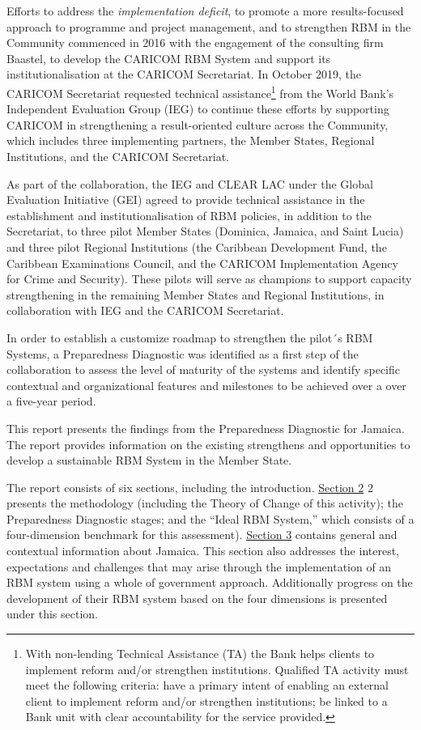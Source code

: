 \documentclass[
  10pt,
]{book}
\begin{document}
Efforts to address the \emph{implementation deficit}, to promote a more results-focused approach to programme and project management, and to strengthen RBM in the Community commenced in 2016 with the engagement of the consulting firm Baastel, to develop the CARICOM RBM System and support its institutionalisation at the CARICOM Secretariat. In October 2019, the CARICOM Secretariat requested technical assistance\footnote{With non-lending Technical Assistance (TA) the Bank helps clients to implement reform and/or strengthen institutions. Qualified TA activity must meet the following criteria: have a primary intent of enabling an external client to implement reform and/or strengthen institutions; be linked to a Bank unit with clear accountability for the service provided.} from the World Bank's Independent Evaluation Group (IEG) to continue these efforts by supporting CARICOM in strengthening a result-oriented culture across the Community, which includes three implementing partners, the Member States, Regional Institutions, and the CARICOM Secretariat.

As part of the collaboration, the IEG and CLEAR LAC under the Global Evaluation Initiative (GEI) agreed to provide technical assistance in the establishment and institutionalisation of RBM policies, in addition to the Secretariat, to three pilot Member States (Dominica, Jamaica, and Saint Lucia) and three pilot Regional Institutions (the Caribbean Development Fund, the Caribbean Examinations Council, and the CARICOM Implementation Agency for Crime and Security). These pilots will serve as champions to support capacity strengthening in the remaining Member States and Regional Institutions, in collaboration with IEG and the CARICOM Secretariat.

In order to establish a customize roadmap to strengthen the pilot´s RBM Systems, a Preparedness Diagnostic was identified as a first step of the collaboration to assess the level of maturity of the systems and identify specific contextual and organizational features and milestones to be achieved over a over a five-year period.

This report presents the findings from the Preparedness Diagnostic for Jamaica. The report provides information on the existing strengthens and opportunities to develop a sustainable RBM System in the Member State.

The report consists of six sections, including the introduction. \protect\hyperlink{section2}{Section 2} 2 presents the methodology (including the Theory of Change of this activity); the Preparedness Diagnostic stages; and the ``Ideal RBM System,'' which consists of a four-dimension benchmark for this assessment). \protect\hyperlink{section3}{Section 3} contains general and contextual information about Jamaica. This section also addresses the interest, expectations and challenges that may arise through the implementation of an RBM system using a whole of government approach. Additionally progress on the development of their RBM system based on the four dimensions is presented under this section.
\end{document}
